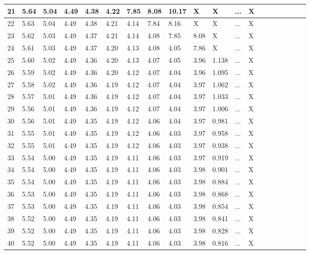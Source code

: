 \documentclass{article}
\begin{document}
\begin{table}[H]
\begin{adjustwidth}{-.6in}{-.6in}
\begin{tabular}{|l|l|l|l|l|l|l|l|l|l|l|l|l|l|l|l|l|l|l|l|}
21 & 5.64 & 5.04 & 4.49 & 4.38 & 4.22 & 7.85 & 8.08 & 10.17 & X & X & ... & X \\ \hline
22 & 5.63 & 5.04 & 4.49 & 4.38 & 4.21 & 4.14 & 7.84 & 8.16 & X & X & ... & X \\ \hline
23 & 5.62 & 5.03 & 4.49 & 4.37 & 4.21 & 4.14 & 4.08 & 7.85 & 8.08 & X & ... & X \\ \hline
24 & 5.61 & 5.03 & 4.49 & 4.37 & 4.20 & 4.13 & 4.08 & 4.05 & 7.86 & X & ... & X \\ \hline
25 & 5.60 & 5.02 & 4.49 & 4.36 & 4.20 & 4.13 & 4.07 & 4.05 & 3.96 & 1.138 & ... & X \\ \hline
26 & 5.59 & 5.02 & 4.49 & 4.36 & 4.20 & 4.12 & 4.07 & 4.04 & 3.96 & 1.095 & ... & X \\ \hline
27 & 5.58 & 5.02 & 4.49 & 4.36 & 4.19 & 4.12 & 4.07 & 4.04 & 3.97 & 1.062 & ... & X \\ \hline
28 & 5.57 & 5.01 & 4.49 & 4.36 & 4.19 & 4.12 & 4.07 & 4.04 & 3.97 & 1.033 & ... & X \\ \hline
29 & 5.56 & 5.01 & 4.49 & 4.36 & 4.19 & 4.12 & 4.07 & 4.04 & 3.97 & 1.006 & ... & X \\ \hline
30 & 5.56 & 5.01 & 4.49 & 4.35 & 4.19 & 4.12 & 4.06 & 4.04 & 3.97 & 0.981 & ... & X \\ \hline
31 & 5.55 & 5.01 & 4.49 & 4.35 & 4.19 & 4.12 & 4.06 & 4.03 & 3.97 & 0.958 & ... & X \\ \hline
32 & 5.55 & 5.01 & 4.49 & 4.35 & 4.19 & 4.12 & 4.06 & 4.03 & 3.97 & 0.938 & ... & X \\ \hline
33 & 5.54 & 5.00 & 4.49 & 4.35 & 4.19 & 4.11 & 4.06 & 4.03 & 3.97 & 0.919 & ... & X \\ \hline
34 & 5.54 & 5.00 & 4.49 & 4.35 & 4.19 & 4.11 & 4.06 & 4.03 & 3.98 & 0.901 & ... & X \\ \hline
35 & 5.54 & 5.00 & 4.49 & 4.35 & 4.19 & 4.11 & 4.06 & 4.03 & 3.98 & 0.884 & ... & X \\ \hline
36 & 5.53 & 5.00 & 4.49 & 4.35 & 4.19 & 4.11 & 4.06 & 4.03 & 3.98 & 0.868 & ... & X \\ \hline
37 & 5.53 & 5.00 & 4.49 & 4.35 & 4.19 & 4.11 & 4.06 & 4.03 & 3.98 & 0.854 & ... & X \\ \hline
38 & 5.52 & 5.00 & 4.49 & 4.35 & 4.19 & 4.11 & 4.06 & 4.03 & 3.98 & 0.841 & ... & X \\ \hline
39 & 5.52 & 5.00 & 4.49 & 4.35 & 4.19 & 4.11 & 4.06 & 4.03 & 3.98 & 0.828 & ... & X \\ \hline
40 & 5.52 & 5.00 & 4.49 & 4.35 & 4.19 & 4.11 & 4.06 & 4.03 & 3.98 & 0.816 & ... & X \\ \hline

\end{tabular}
\end{adjustwidth}
\end{table}
\end{document}
